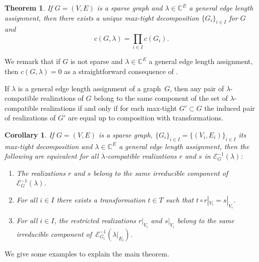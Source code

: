 \documentclass[12pt]{article}
\newtheorem{theorem}{Theorem}
\newtheorem{corollary}{Corollary}
\theoremstyle{definition}
\newenvironment{Menum}{\begin{enumerate}[topsep=0pt,itemsep=0pt,leftmargin=10mm,label=(\roman*),ref=(\roman*)]}{\end{enumerate}}
\newcommand{\st}{such that }
\newcommand{\C}{{\mathbb{C}}}
\newcommand{\cE}{\mathcal{E}}
\begin{document}
\begin{theorem}
\label{thm:main}
If $G=(V,E)$ is a sparse graph and $\lambda\in\C^E$ a general edge length assignment,
then there exists a unique max-tight decomposition $\{G_i\}_{i\in I}$ for $G$ and
\[
c(G,\lambda)=\prod_{i\in I} c(G_i).
\]
\end{theorem}

We remark that if $G$ is not sparse and $\lambda\in\C^E$ a general edge length assignment,
then $c(G,\lambda)=0$ as a straightforward consequence of .

If $\lambda$ is a general edge length assignment of a graph~$G$,
then any pair of $\lambda$-compatible realizations of $G$
belong to the same component of the set of $\lambda$-compatible realizations
if and only if
for each max-tight $G'\subset G$ the induced pair of realizations of $G'$
are equal up to composition with transformations.

\begin{corollary}
\label{cor:main}
If $G=(V,E)$ is a sparse graph, $\{G_i\}_{i\in I}=\{(V_i,E_i)\}_{i\in I}$ its max-tight decomposition
and $\lambda\in\C^E$ a general edge length assignment,
then the following are equivalent for all $\lambda$-compatible realizations $r$ and $s$ in $\cE_G^{-1}(\lambda)$:
\begin{Menum}
\item\label{cor:main:i}
The realizations $r$ and $s$ belong to the same irreducible component of~$\cE_G^{-1}(\lambda)$.
\item\label{cor:main:ii}
For all $i\in I$ there exists a transformation $t\in T$ \st $t\circ r|_{V_i}=s|_{V_i}$.
\item\label{cor:main:iii}
For all $i\in I$, the restricted realizations $r|_{V_i}$ and $s|_{V_i}$
belong to the same irreducible component of~$\cE_{G_i}^{-1}(\lambda|_{E_i})$.
\end{Menum}
\end{corollary}

We give some examples to explain the main theorem.
\end{document}
